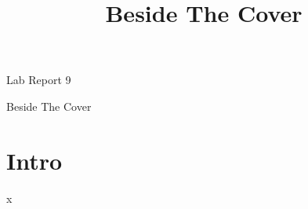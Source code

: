 \documentclass{article}
\title{Beside The Cover}
\begin{document}
\begin{titlepage}
\begin{center}{\large Lab Report 9\par}\end{center}
\end{titlepage}
\begin{center}{\Huge Beside The Cover}\end{center}
\section{Intro}
x
\end{document}
